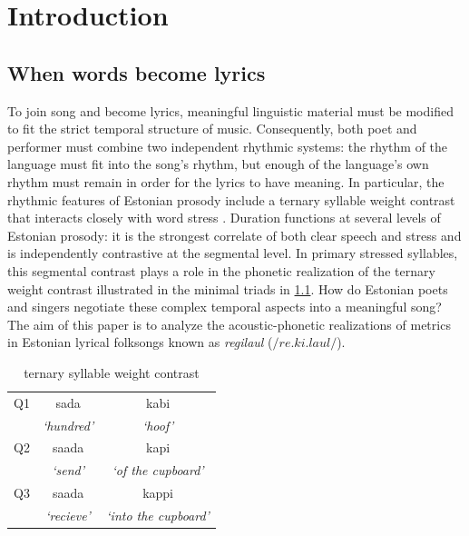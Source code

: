\chapter{Introduction}

\section{When words become lyrics}
To join song and become lyrics, meaningful linguistic material must be modified to fit the strict temporal structure of music. Consequently, both poet and performer must combine two independent rhythmic systems: the rhythm of the language must fit into the song's rhythm, but enough of the language's own rhythm must remain in order for the lyrics to have meaning. 
In particular, the rhythmic features of Estonian prosody include a ternary syllable weight contrast that interacts closely with word stress \citep{lehiste1960,lehiste1965,lehiste1978,eekMeister1998,asuPire2009}.  
Duration functions at several levels of Estonian prosody: it is the strongest correlate of both clear speech and stress \citep{lippusAsuMari2014} and is independently contrastive at the segmental level. In primary stressed syllables, this segmental contrast plays a role in the phonetic realization of the ternary weight contrast illustrated in the minimal triads in \ref{qexamps}.  How do Estonian poets and singers negotiate these complex temporal aspects into a meaningful song? The aim of this paper is to analyze the acoustic-phonetic realizations of metrics in Estonian lyrical folksongs known as {\it regilaul} (\(/re.ki.laul/\)). 

 \begin{table}[htb]
\centering
\begin{tabular}{lcc}
\hline

Q1 &		 sada 		& 	kabi  \\  
	&	 {\it `hundred'} 	&	 {\it`hoof' }\\
\hline
Q2 &		saada 		&	kapi \\
	&	 {\it`send' }		&	{\it`of the cupboard' }		\\
\hline
Q3 &		saada 	&	 kappi 	\\
	&	{\it`recieve' }	&	{\it`into the cupboard' }	\\
\hline
\end{tabular}

\caption{ternary syllable weight contrast}
\label{qexamps}
\end{table}

